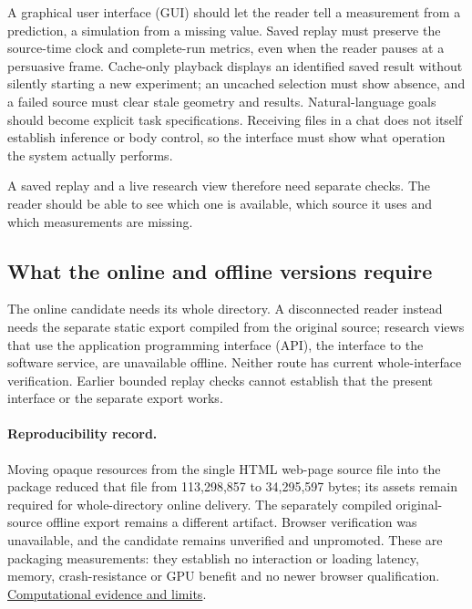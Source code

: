 A graphical user interface (GUI) should let the reader tell a measurement from a prediction, a simulation from a missing value. Saved replay must preserve the source-time clock and complete-run metrics, even when the reader pauses at a persuasive frame. Cache-only playback displays an identified saved result without silently starting a new experiment; an uncached selection must show absence, and a failed source must clear stale geometry and results. Natural-language goals should become explicit task specifications. Receiving files in a chat does not itself establish inference or body control, so the interface must show what operation the system actually performs.\par

A saved replay and a live research view therefore need separate checks. The reader should be able to see which one is available, which source it uses and which measurements are missing.\par

\subsection{What the online and offline versions require}

The online candidate needs its whole directory. A disconnected reader instead
needs the separate static export compiled from the original source; research
views that use the application programming interface (API), the interface to
the software service, are unavailable offline. Neither route has current
whole-interface verification. Earlier bounded replay checks cannot establish
that the present interface or the separate export works.\par

\paragraph{Reproducibility record.}
Moving opaque resources from the single HTML web-page source file into the
package reduced that file from 113,298,857 to 34,295,597 bytes; its assets
remain required for whole-directory online delivery. The separately compiled
original-source offline export remains a different artifact.
Browser verification was unavailable, and the candidate remains unverified and
unpromoted. These are packaging measurements: they establish no interaction or
loading latency, memory, crash-resistance or GPU benefit and no newer browser
qualification. \href{research-evidence.json}{Computational evidence and limits}.\par


